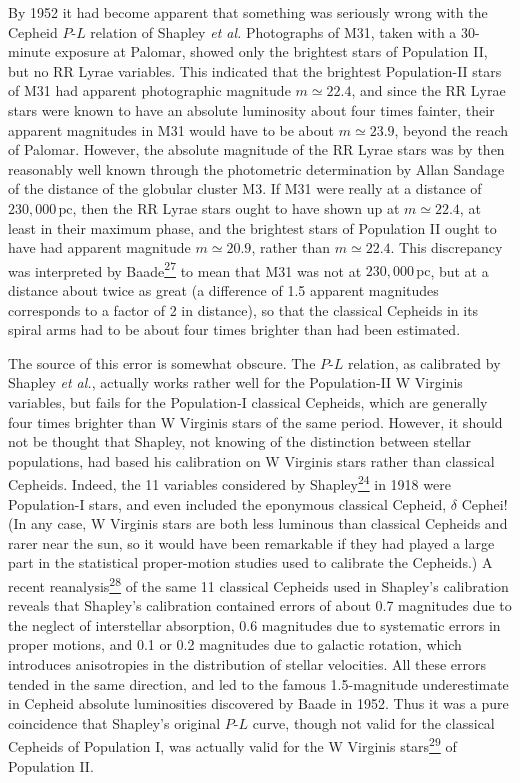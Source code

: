 By 1952 it had become apparent that something was seriously wrong with the
Cepheid \(P\)-\(L\) relation of Shapley \emph{et al.} Photographs of M31,
taken with a 30-minute exposure at Palomar, showed only the brightest stars
of Population II, but no RR Lyrae variables. This indicated that the
brightest Population-II stars of M31 had apparent photographic magnitude
\(m\simeq22.4\), and since the RR Lyrae stars were known to have an absolute
luminosity about four times fainter, their apparent magnitudes in M31 would
have to be about \(m\simeq23.9\), beyond the reach of Palomar. However, the
absolute magnitude of the RR Lyrae stars was by then reasonably well known
through the photometric determination by Allan Sandage of the distance of
the globular cluster M3. If M31 were really at a distance of
\(230{,}000\,\mathrm{pc}\), then the RR Lyrae stars ought to have shown up
at \(m\simeq22.4\), at least in their maximum phase, and the brightest stars
of Population II ought to have had apparent magnitude \(m\simeq20.9\),
rather than \(m\simeq22.4\). This discrepancy was interpreted by
Baade\hyperref[ch14-ref-27]{\textsuperscript{27}} to mean that M31 was not
at \(230{,}000\,\mathrm{pc}\), but at a distance about twice as great (a
difference of 1.5 apparent magnitudes corresponds to a factor of 2 in
distance), so that the classical Cepheids in its spiral arms had to be about
four times brighter than had been estimated.

The source of this error is somewhat obscure. The \(P\)-\(L\) relation, as
calibrated by Shapley \emph{et al.}, actually works rather well for the
Population-II W Virginis variables, but fails for the Population-I classical
Cepheids, which are generally four times brighter than W Virginis stars of
the same period. However, it should not be thought that Shapley, not knowing
of the distinction between stellar populations, had based his calibration
on W Virginis stars rather than classical Cepheids. Indeed, the 11 variables
considered by Shapley\hyperref[ch14-ref-24]{\textsuperscript{24}} in 1918
were Population-I stars, and even included the eponymous classical Cepheid,
\(\delta\) Cephei! (In any case, W Virginis stars are both less luminous
than classical Cepheids and rarer near the sun, so it would have been
remarkable if they had played a large part in the statistical proper-motion
studies used to calibrate the Cepheids.) A recent
reanalysis\hyperref[ch14-ref-28]{\textsuperscript{28}} of the same 11
classical Cepheids used in Shapley's calibration reveals that Shapley's
calibration contained errors of about 0.7 magnitudes due to the neglect of
interstellar absorption, 0.6 magnitudes due to systematic errors in proper
motions, and 0.1 or 0.2 magnitudes due to galactic rotation, which introduces
anisotropies in the distribution of stellar velocities. All these errors
tended in the same direction, and led to the famous 1.5-magnitude
underestimate in Cepheid absolute luminosities discovered by Baade in 1952.
Thus it was a pure coincidence that Shapley's original \(P\)-\(L\) curve,
though not valid for the classical Cepheids of Population I, was actually
valid for the W Virginis stars\hyperref[ch14-ref-29]{\textsuperscript{29}}
of Population II.

